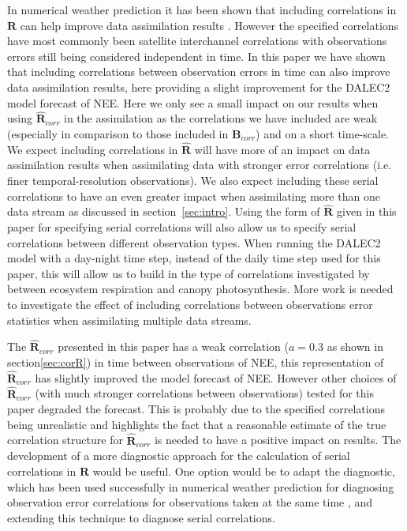 \documentclass[review]{elsarticle}
\begin{document}
In numerical weather prediction it has been shown that including correlations in $\textbf{R}$ can help improve data assimilation results \citep{weston2014accounting, Stewart2013}. However the specified correlations have most commonly been satellite interchannel correlations with observations errors still being considered independent in time. In this paper we have shown that including correlations between observation errors in time can also improve data assimilation results, here providing a slight improvement for the DALEC2 model forecast of NEE. Here we only see a small impact on our results when using $\hat{\mathbf{R}}_{corr}$ in the assimilation as the correlations we have included are weak (especially in comparison to those included in ${\mathbf{B}}_{corr}$)  and on a short time-scale. We expect including correlations in $\hat{\textbf{R}}$ will have more of an impact on data assimilation results when assimilating data with stronger error correlations (i.e. finer temporal-resolution observations). We also expect including these serial correlations to have an even greater impact when assimilating more than one data stream as discussed in section~\ref{sec:intro}. Using the form of $\hat{\mathbf{R}}$ given in this paper for specifying serial correlations will also allow us to specify serial correlations between different observation types. When running the DALEC2 model with a day-night time step, instead of the daily time step used for this paper, this will allow us to build in the type of correlations investigated by \citet{Baldocchi2015} between ecosystem respiration and canopy photosynthesis. More work is needed to investigate the effect of including correlations between observations error statistics when assimilating multiple data streams.

The $\hat{\mathbf{R}}_{corr}$ presented in this paper has a weak correlation ($a=0.3$ as shown in section\ref{sec:corR}) in time between observations of NEE, this representation of $\hat{\mathbf{R}}_{corr}$ has slightly improved the model forecast of NEE. However other choices of $\hat{\mathbf{R}}_{corr}$ (with much stronger correlations between observations) tested for this paper degraded the forecast. This is probably due to the specified correlations being unrealistic and highlights the fact that a reasonable estimate of the true correlation structure for $\hat{\mathbf{R}}_{corr}$ is needed to have a positive impact on results. The development of a more diagnostic approach for the calculation of serial correlations in $\hat{\mathbf{R}}$ would be useful. One option would be to adapt the \citet{desroziers2005diagnosis} diagnostic, which has been used successfully in numerical weather prediction for diagnosing observation error correlations for observations taken at the same time \citep{weston2014accounting}, and extending this technique to diagnose serial correlations.
\end{document}
